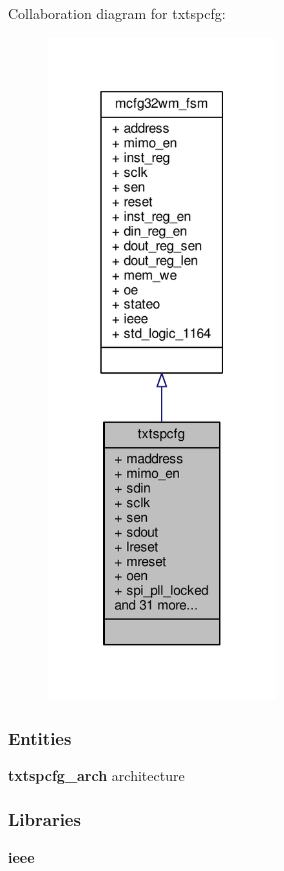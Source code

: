 Collaboration diagram for txtspcfg\+:\nopagebreak
\begin{figure}[H]
\begin{center}
\leavevmode
\includegraphics[width=171pt]{d1/d69/classtxtspcfg__coll__graph}
\end{center}
\end{figure}
\subsubsection*{Entities}
\begin{DoxyCompactItemize}
\item 
{\bf txtspcfg\+\_\+arch} architecture
\end{DoxyCompactItemize}
\subsubsection*{Libraries}
 \begin{DoxyCompactItemize}
\item 
{\bf ieee} 
\end{DoxyCompactItemize}
